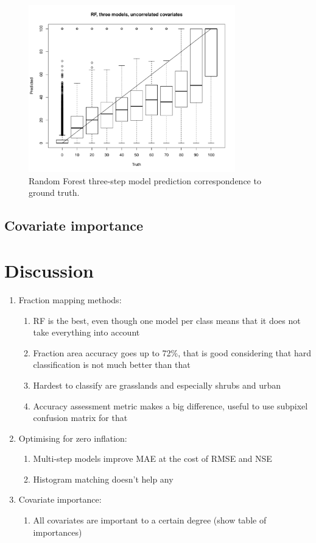 \documentclass[a4paper,10pt]{article}
\begin{document}
\begin{figure}
    \includegraphics[width=0.8\textwidth]{article-figures/boxplots/2019-03-19-rf-3m-uncor-box}
    \caption{Random Forest three-step model prediction correspondence to ground truth.}
    \label{box-rf-3m-uncor-hm}
\end{figure}

\subsection{Covariate importance}

\section{Discussion}

\begin{enumerate}
 \item Fraction mapping methods:
 \begin{enumerate}
    \item RF is the best, even though one model per class means that it does not take everything into account
    \item Fraction area accuracy goes up to 72\%, that is good considering that hard classification is not much better than that
    \item Hardest to classify are grasslands and especially shrubs and urban
    \item Accuracy assessment metric makes a big difference, useful to use subpixel confusion matrix for that
 \end{enumerate}
 \item Optimising for zero inflation:
 \begin{enumerate}
    \item Multi-step models improve MAE at the cost of RMSE and NSE
    \item Histogram matching doesn't help any
 \end{enumerate}
 \item Covariate importance:
 \begin{enumerate}
    \item All covariates are important to a certain degree (show table of importances)
 \end{enumerate}
\end{enumerate}
\end{document}
